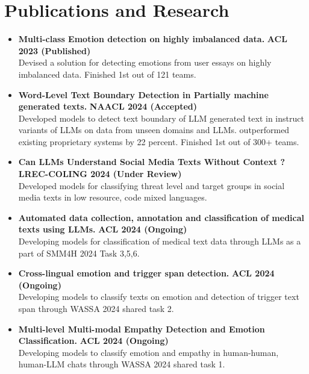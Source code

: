 \documentclass[letterpaper,11pt]{article}
\newcommand{\resumeItem}[1]{\item\small{{#1 \vspace{-2pt}}}}
\newcommand{\resumeSubItem}[1]{\resumeItem{#1}\vspace{-4pt}}
\newcommand{\resumeSubHeadingListStart}{\begin{itemize}[leftmargin=0.0in, label={}]}
\newcommand{\resumeSubHeadingListEnd}{\end{itemize}}
\begin{document}
\section{\textcolor{myColor1}{Publications and Research}}
  \resumeSubHeadingListStart
    \resumeSubItem
      {\textbf{\textcolor{myColor2}{Multi-class Emotion detection on highly imbalanced data.}} \hfill\textbf{\textcolor{myColor2}{ACL 2023 (Published)}}}\\
        \vspace{6pt}  Devised a solution for detecting emotions from user essays on highly imbalanced data. Finished 1st out of 121 teams.\vspace{-5pt}
    \resumeSubItem
      {\textbf{\textcolor{myColor2}{Word-Level Text Boundary Detection in Partially machine generated texts.}} \hfill\textbf{\textcolor{myColor2}{NAACL 2024 (Accepted)}}}\\
        \vspace{6pt}  Developed models to detect text boundary of LLM generated text in instruct variants of LLMs on data from unseen domains and LLMs. outperformed existing proprietary systems by 22 percent. Finished 1st out of 300+ teams.\vspace{-5pt}
    \resumeSubItem
      {\textbf{\textcolor{myColor2}{Can LLMs Understand Social Media Texts Without Context ?}} \hfill\textbf{\textcolor{myColor2}{LREC-COLING 2024 (Under Review)}}}\\
        \vspace{6pt}  Developed models for classifying threat level and target groups in social media texts in low resource, code mixed languages.\vspace{-5pt}
    \resumeSubItem
      {\textbf{\textcolor{myColor2}{Automated data collection, annotation and classification of medical texts using LLMs.}} \hfill\textbf{\textcolor{myColor2}{ACL 2024 (Ongoing)}}}\\
        \vspace{6pt}  Developing models for classification of medical text data through LLMs as a part of SMM4H 2024 Task 3,5,6.\vspace{-5pt}
    \resumeSubItem
      {\textbf{\textcolor{myColor2}{Cross-lingual emotion and trigger span detection.}} \hfill\textbf{\textcolor{myColor2}{ACL 2024 (Ongoing)}}}\\
        \vspace{6pt}  Developing models to classify texts on emotion and detection of trigger text span through WASSA 2024 shared task 2.\vspace{-5pt}
    \resumeSubItem
      {\textbf{\textcolor{myColor2}{Multi-level Multi-modal Empathy Detection and Emotion Classification.}} \hfill\textbf{\textcolor{myColor2}{ACL 2024 (Ongoing)}}}\\
        \vspace{6pt}  Developing models to classify emotion and empathy in human-human, human-LLM chats through WASSA 2024 shared task 1.\vspace{-8pt}
  \resumeSubHeadingListEnd  
\end{document}
